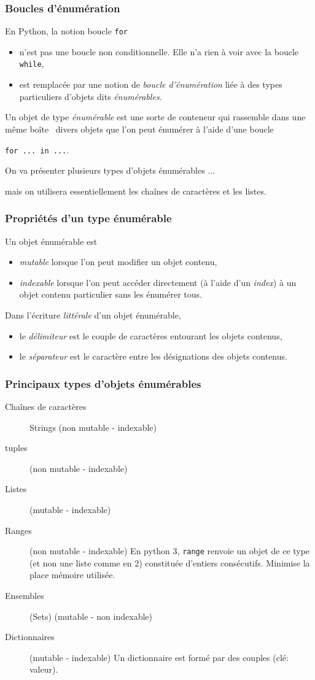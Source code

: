 



\begin{frame}
  \frametitle{Boucles d'énumération}
En Python, la notion boucle \texttt{for}
\begin{itemize}
  \item  n'est pas une boucle non conditionnelle. Elle n'a rien à voir avec la boucle \texttt{while},
  \item  est remplacée par une notion de \emph{boucle d'énumération} liée à des types particuliers d'objets dits \emph{énumérables}.
\end{itemize}
Un objet de type \emph{énumérable} est une sorte de conteneur qui rassemble \og dans une même boîte\fg~ divers objets que l'on peut énumérer  à l'aide d'une boucle
\begin{center}
\texttt{for ... in ...}.  
\end{center}
On va présenter plusieurs types d'objets énumérables ...

mais on utilisera essentiellement les chaînes de caractères et les listes.
\end{frame}

\begin{frame}
  \frametitle{Propriétés d'un type énumérable}
Un objet énumérable est
\begin{itemize}
  \item \emph{mutable} lorsque l'on peut modifier un objet contenu,
  \item \emph{indexable} lorsque l'on peut accéder directement (à l'aide d'un \emph{index}) à un objet contenu particulier sans les énumérer tous.
\end{itemize}

Dans l'écriture \emph{littérale} d'un objet énumérable,
\begin{itemize}
  \item le \emph{délimiteur} est le couple de caractères entourant les objets contenus,
  \item le \emph{séparateur} est le caractère entre les désignations des objets contenus.
\end{itemize}
\end{frame}

\begin{frame}
  \frametitle{Principaux types d'objets énumérables}
\begin{description}
 \item [Chaînes de caractères] Strings (non mutable - indexable) 
 \item [tuples] (non mutable - indexable) 
 \item [Listes] (mutable - indexable)
 \item [Ranges] (non mutable - indexable) En python 3, \texttt{range} renvoie un objet de ce type (et non une liste comme en 2) constituée d'entiers consécutifs. Minimise la place mémoire utilisée.
 \item [Ensembles] (Sets) (mutable - non indexable) 
 \item [Dictionnaires] (mutable - indexable) Un dictionnaire est formé par des couples (clé: valeur). 
\end{description}
\end{frame}

